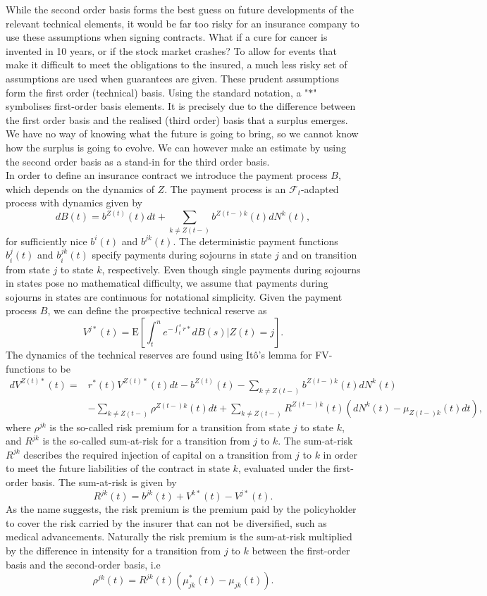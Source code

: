 \documentclass[12pt]{article}
\newcommand{\E}{\text{E}}
\theoremstyle{my_thm}
\begin{document}
While the second order basis forms the best guess on future developments of the relevant technical elements, it would be far too risky for an insurance company to use these assumptions when signing contracts. What if a cure for cancer is invented in 10 years, or if the stock market crashes? To allow for events that make it difficult to meet the obligations to the insured, a much less risky set of assumptions are used when guarantees are given. These prudent assumptions form the first order (technical) basis. Using the standard notation, a "$*$" symbolises first-order basis elements. It is precisely due to the difference between the first order basis and the realised (third order) basis that a surplus emerges. We have no way of knowing what the future is going to bring, so we cannot know how the surplus is going to evolve. We can however make an estimate by using the second order basis as a stand-in for the third order basis.
\\
In order to define an insurance contract we introduce the payment process $B$, which depends on the dynamics of $Z$. The payment process is an $\mathcal{F}_t$-adapted process with dynamics given by
$$
dB(t)=b^{Z(t)}(t) dt +\sum_{k \neq Z(t-)} b^{Z(t-)k}(t)dN^k(t),
$$
for sufficiently nice $b^i(t)$ and $b^{jk}(t)$. The deterministic payment functions $b_i^j(t)$ and $b_i^{jk}(t)$ specify payments during sojourns in state $j$ and on transition from state $j$ to state $k$, respectively. Even though single payments during sojourns in states pose no mathematical difficulty, we assume that payments during sojourns in states are continuous for notational simplicity. Given the payment process $B$, we can define the prospective technical reserve as
$$
V^{j*}(t)=\E \left[ \int_t^n  e^{-\int_t^s r*} dB(s) |Z(t)=j \right].
$$
The dynamics of the technical reserves are found using Itô's lemma for FV-functions to be
\begin{align}
dV^{Z(t)*}(t)=&r^*(t)V^{Z(t)*}(t)dt - b^{Z(t)}(t) -\sum_{k\neq Z(t-)}b^{Z(t-)k}(t) dN^k(t)\nonumber
\\
&-\sum_{k\neq Z(t-)} \rho^{Z(t-)k}(t) dt
+
\sum_{k\neq Z(t-)} R^{Z(t-)k}(t)(dN^k(t)-\mu_{Z(t-)k}(t) dt), \label{eq:AAP}
\end{align}
where $\rho^{jk}$ is the so-called risk premium for a transition from state $j$ to state $k$, and $R^{jk}$ is the so-called sum-at-risk for a transition from $j$ to $k$. The sum-at-risk $R^{jk}$ describes the required injection of capital on a transition from $j$ to $k$ in order to meet the future liabilities of the contract in state $k$, evaluated under the first-order basis. The sum-at-risk is given by
$$
R^{jk}(t)=b^{jk}(t)+V^{k*}(t)-V^{j*}(t).
$$
As the name suggests, the risk premium is the premium paid by the policyholder to cover the risk carried by the insurer that can not be diversified, such as medical advancements. Naturally the risk premium is the sum-at-risk multiplied by the difference in intensity for a transition from $j$ to $k$ between the first-order basis and the second-order basis, i.e
$$
\rho^{jk}(t)=R^{jk}(t)(\mu^*_{jk}(t)-\mu_{jk}(t)).
$$
\end{document}
